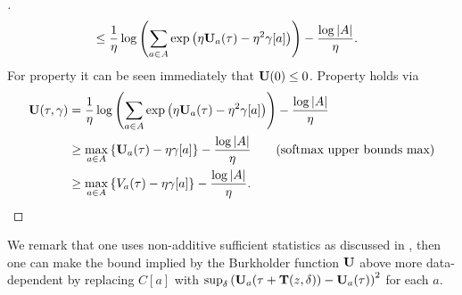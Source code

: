 \begin{proof}[]
\begin{align*}
 & \le \frac{1}{\eta}  \log\left(\sum_{a \in A} \exp\left(\eta\mathbf{U}_a(\tau)   - \eta^2 \gamma[a] \right)\right) - \frac{\log|A|}{\eta}.
\end{align*}
For property \propone{} it can be seen immediately that $\mathbf{U}(0) \le 0$. Property \proptwo{} holds via
\begin{align*}
 \mathbf{U}(\tau,\gamma) &= \frac{1}{\eta} \log\left(\sum_{a \in A} \exp\left(\eta \mathbf{U}_a(\tau) - \eta^2 \gamma[a] \right)\right)  - \frac{\log|A|}{\eta}\\
& \ge \max_{a \in A}\left\{ \mathbf{U}_a(\tau) - \eta \gamma[a]\right\} - \frac{\log|A|}{\eta} ~~~~~~ \textrm{(softmax upper bounds max)}\\
& \ge \max_{a \in A}\left\{ V_a(\tau) - \eta \gamma[a]\right\} - \frac{\log|A|}{\eta}.
\end{align*}
\end{proof}
We remark that one uses non-additive sufficient statistics as discussed in , then one can make the bound implied by the Burkholder function $\mathbf{U}$ above more data-dependent by replacing $C[a]$ with $\sup_{\delta} \left(\mathbf{U}_a(\tau + \mathbf{T}(z,\delta)) - \mathbf{U}_a(\tau) \right)^2$ for each $a$. 
